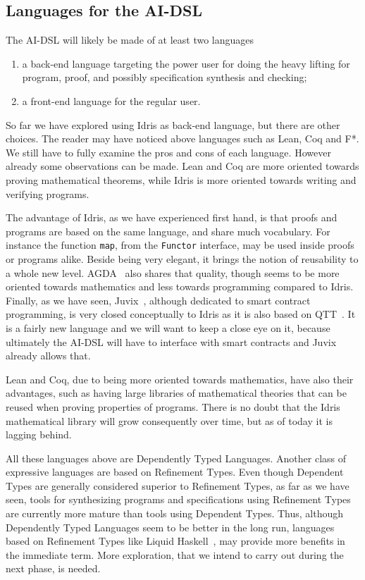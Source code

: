\documentclass[]{report}
\begin{document}
\subsection{Languages for the AI-DSL}

The AI-DSL will likely be made of at least two languages
\begin{enumerate}
\item a back-end language targeting the power user for doing the heavy
  lifting for program, proof, and possibly specification synthesis and
  checking;
\item a front-end language for the regular user.
\end{enumerate}
So far we have explored using Idris as back-end language, but there
are other choices.  The reader may have noticed above languages such
as Lean, Coq and F*.  We still have to fully examine the pros and cons
of each language.  However already some observations can be made.
Lean and Coq are more oriented towards proving mathematical theorems,
while Idris is more oriented towards writing and verifying programs.

The advantage of Idris, as we have experienced first hand, is that
proofs and programs are based on the same language, and share much
vocabulary.  For instance the function \texttt{map}, from the
\texttt{Functor} interface, may be used inside proofs or programs
alike.  Beside being very elegant, it brings the notion of reusability
to a whole new level.  AGDA~\cite{Norell2009} also shares that
quality, though seems to be more oriented towards mathematics and less
towards programming compared to Idris.  Finally, as we have seen,
Juvix~\cite{Goes2020}, although dedicated to smart contract
programming, is very closed conceptually to Idris as it is also based
on QTT~\cite{Atkey2018}.  It is a fairly new language and we will want
to keep a close eye on it, because ultimately the AI-DSL will have to
interface with smart contracts and Juvix already allows that.

Lean and Coq, due to being more oriented towards mathematics, have
also their advantages, such as having large libraries of mathematical
theories that can be reused when proving properties of programs.
There is no doubt that the Idris mathematical library will grow
consequently over time, but as of today it is lagging behind.

All these languages above are Dependently Typed Languages.  Another
class of expressive languages are based on Refinement Types.  Even
though Dependent Types are generally considered superior to Refinement
Types, as far as we have seen, tools for synthesizing programs and
specifications using Refinement Types are currently more mature than
tools using Dependent Types.  Thus, although Dependently Typed
Languages seem to be better in the long run, languages based on
Refinement Types like Liquid Haskell~\cite{}, may provide more
benefits in the immediate term.  More exploration, that we intend to
carry out during the next phase, is needed.
\end{document}

